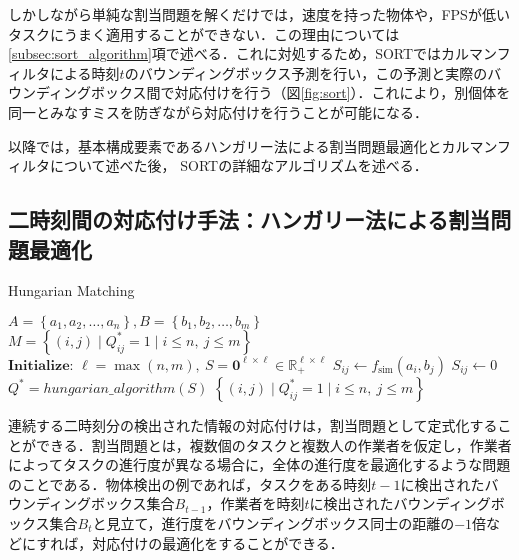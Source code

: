     しかしながら単純な割当問題を解くだけでは，速度を持った物体や，FPSが低いタスクにうまく適用することができない．この理由については\ref{subsec:sort_algorithm}項で述べる．これに対処するため，SORTではカルマンフィルタによる時刻$t$のバウンディングボックス予測を行い，この予測と実際のバウンディングボックス間で対応付けを行う（図\ref{fig:sort}）．これにより，別個体を同一とみなすミスを防ぎながら対応付けを行うことが可能になる．

    以降では，基本構成要素であるハンガリー法による割当問題最適化とカルマンフィルタについて述べた後， SORTの詳細なアルゴリズムを述べる．

    \subsection{二時刻間の対応付け手法：ハンガリー法による割当問題最適化}
    \label{subsec:hungarian_algorithm}

    \begin{algorithm}[t]
        \caption{Hungarian Matching}
        \label{alg:hungarian_matching}
        \begin{algorithmic}[1]
            \Require $A = \left\{a_1, a_2, \dots, a_n\right\}, B = \left\{b_1, b_2, \dots, b_m\right\}$
            \Ensure $M = \left\{(i, j) \mid Q^*_{ij} = 1 \mid i \leq n , ~ j \leq m\right\}$
            \State $\textbf{Initialize: } \ell = \max(n, m), ~ S = \bm{0}^{\ell \times \ell} \in \mathbb{R}_+^{\ell \times \ell}$
                        \State $S_{ij} \gets f_{\text{sim}}(a_i, b_j)$
                    \Else
                        \State $S_{ij} \gets 0$
                    \EndIf
                \EndFor
            \EndFor
            \State $Q^* = hungarian\_algorithm(S)$
            \State \Return $\left\{(i, j) \mid Q^*_{ij} = 1 \mid i \leq n , ~ j \leq m\right\}$
        \end{algorithmic}
    \end{algorithm}

    連続する二時刻分の検出された情報の対応付けは，割当問題として定式化することができる．割当問題とは，複数個のタスクと複数人の作業者を仮定し，作業者によってタスクの進行度が異なる場合に，全体の進行度を最適化するような問題のことである．物体検出の例であれば，タスクをある時刻$t-1$に検出されたバウンディングボックス集合$B_{t-1}$，作業者を時刻$t$に検出されたバウンディングボックス集合$B_{t}$と見立て，進行度をバウンディングボックス同士の距離の$-1$倍などにすれば，対応付けの最適化をすることができる．

